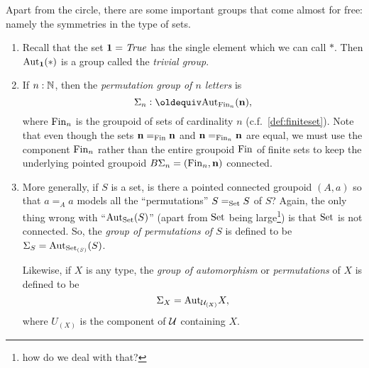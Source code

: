 \begin{example}\label{ex:groups}
  Apart from the circle, there are some important groups that come almost for free: namely the symmetries in the type of sets.
  \begin{enumerate}
  \item Recall that the set $\mathbf{1} =\mathop{\mathit{True}}$ has the single element which we can call $*$. Then $\mathrm{Aut}_{\mathbf{1} }(*)$ is a group called the \emph{trivial group}.
  \item If $n:\mathbb{N}$, then the \emph{permutation group of $n$ letters} is 
$$\Sigma_n\defequi\aut_{\fin_n}(\bn{n} ),$$ 
where $\operatorname{Fin}_n$ is the groupoid of sets of cardinality $n$ (c.f.~\ref{def:finiteset}).  Note that even though the sets $\mathbf{n} =_{\operatorname{Fin}}\mathbf{n} $ and $\mathbf{n} =_{\operatorname{Fin}_n}\mathbf{n} $ are equal, we must use the component $\operatorname{Fin}_n$ rather than the entire groupoid $\operatorname{Fin}$ of finite sets to keep the underlying pointed groupoid $B\Sigma_n=(\operatorname{Fin}_n,\mathbf{n} )$ connected.
  \item More generally, if $S$ is a set, is there a pointed connected groupoid $(A,a)$ so that $a=_Aa$ models all the ``permutations'' $S=_{\mathord{\mathrm{Set}}}S$ of $S$?  Again, the only thing wrong with ``$\mathrm{Aut}_{\mathord{\mathrm{Set}}}(S)$'' (apart from $\mathord{\mathrm{Set}}$ being large\footnote{how do we deal with that?}) is that $\mathord{\mathrm{Set}}$ is not connected. 
%
 So, 
the \emph{group of permutations of $S$} is defined to be $\Sigma_{S}=\mathrm{Aut}_{\mathord{\mathrm{Set}}_{(S)}}(S)$.  

Likewise, if $X$ is any type, the \emph{group of automorphism} or \emph{permutations} of $X$ is defined to be 
$$\Sigma_X=\mathrm{Aut}_{\mathcal{U}_{(X)}}X,$$
 where $U_{(X)}$ is the component of $\mathcal{U}$ containing $X$.
  \end{enumerate}
\end{example}
